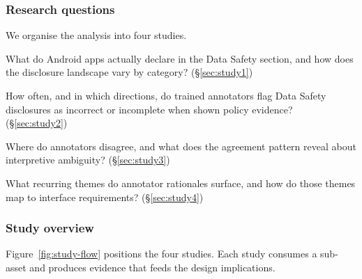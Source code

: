 \documentclass[11pt,a4paper]{article}
\begin{document}
\subsubsection{Research questions}
We organise the analysis into four studies.
\begin{description}[leftmargin=*,nosep,topsep=2pt]
\item[RQ1.]
What do Android apps actually declare in the Data Safety section, and
how does the disclosure landscape vary by category?
(\S\ref{sec:study1})
\item[RQ2.]
How often, and in which directions, do trained annotators flag Data
Safety disclosures as incorrect or incomplete when shown policy
evidence? (\S\ref{sec:study2})
\item[RQ3.]
Where do annotators disagree, and what does the agreement pattern
reveal about interpretive ambiguity? (\S\ref{sec:study3})
\item[RQ4.]
What recurring themes do annotator rationales surface, and how do those
themes map to interface requirements? (\S\ref{sec:study4})
\end{description}

\subsubsection{Study overview}
Figure~\ref{fig:study-flow} positions the four studies. Each study consumes
a sub-asset and produces evidence that feeds the design implications.
\end{document}
